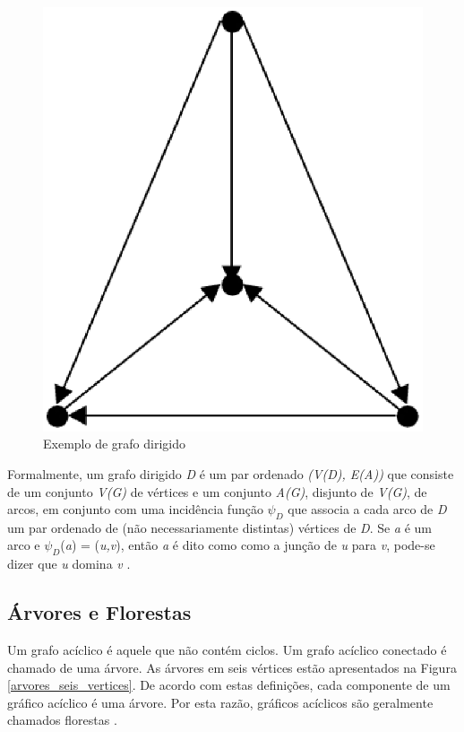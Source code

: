 \begin{figure}[!h]
	\centering
	\includegraphics[scale=0.5]{figuras/capitulo2/dirigido.eps}
	\caption{Exemplo de grafo dirigido}
	\label{dirigido}
\end{figure}

Formalmente, um grafo dirigido \textit{D} é um par ordenado \textit{(V(D), E(A))} que consiste de um conjunto \textit{V(G)} de vértices e um conjunto \textit{A(G)}, disjunto de \textit{V(G)}, de arcos, em conjunto com uma incidência função $\psi_D$ que associa a cada arco de \textit{D} um par ordenado de (não necessariamente distintas) vértices de \textit{D}. Se \textit{a} é um arco e $\psi_D$(\textit{a}) = (\textit{u,v}), então \textit{a} é dito como como a junção de \textit{u} para \textit{v}, pode-se dizer que \textit{u} domina \textit{v} \cite{Diestel:1997}.

\subsection{Árvores e Florestas}

Um grafo acíclico é aquele que não contém ciclos. Um grafo acíclico conectado é chamado de uma árvore. As árvores em seis vértices estão apresentados na Figura \ref{arvores_seis_vertices}. De acordo com estas definições, cada componente de um gráfico acíclico é uma árvore. Por esta razão, gráficos acíclicos são geralmente chamados florestas \cite{Bondy:2007}.

